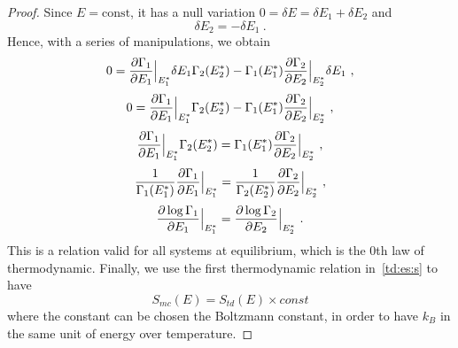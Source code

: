 \begin{proof}
        Since $E = \text{const}$, it has a null variation $0 = \delta E = \delta E_1 + \delta E_2$ and 
        \begin{equation}\label{proof4}
            \delta E_2 = - \delta E_1 ~.
        \end{equation} 
        Hence, with a series of manipulations, we obtain
        \begin{equation*}
            0 = \frac{\partial\Gamma_1}{\partial E_1} \Big\vert_{E^*_1} \delta E_1 \Gamma_2 (E^*_2) - \Gamma_1(E^*_1) \frac{\partial\Gamma_2}{\partial E_2} \Big\vert_{E^*_2} \delta E_1  ~,
        \end{equation*}
        \begin{equation*}
            0 = \frac{\partial\Gamma_1}{\partial E_1} \Big\vert_{E^*_1} \Gamma_2 (E^*_2) - \Gamma_1(E^*_1) \frac{\partial\Gamma_2}{\partial E_2} \Big\vert_{E^*_2}  ~,
        \end{equation*}
        \begin{equation*}
            \frac{\partial\Gamma_1}{\partial E_1} \Big\vert_{E^*_1} \Gamma_2 (E^*_2) = \Gamma_1(E^*_1) \frac{\partial\Gamma_2}{\partial E_2} \Big\vert_{E^*_2} ~,
        \end{equation*}
        \begin{equation*}
            \frac{1}{\Gamma_1 (E^*_1)} \frac{\partial\Gamma_1}{\partial E_1} \Big\vert_{E^*_1} = \frac{1}{\Gamma_2 (E^*_2)} \frac{\partial\Gamma_2}{\partial E_2} \Big\vert_{E^*_2} ~,
        \end{equation*}
        \begin{equation*}
            \frac{\partial\log \Gamma_1}{\partial E_1} \Big\vert_{E^*_1} = \frac{\partial\log \Gamma_2}{\partial E_2} \Big\vert_{E^*_2} ~.
        \end{equation*}
        This is a relation valid for all systems at equilibrium, which is the $0$th law of thermodynamic. Finally, we use the first thermodynamic relation in~\eqref{td:es:s} to have
        \begin{equation*}
            S_{mc} (E) = S_{td} (E) \times const
        \end{equation*}
        where the constant can be chosen the Boltzmann constant, in order to have $k_B$ in the same unit of energy over temperature.
    \end{proof}

